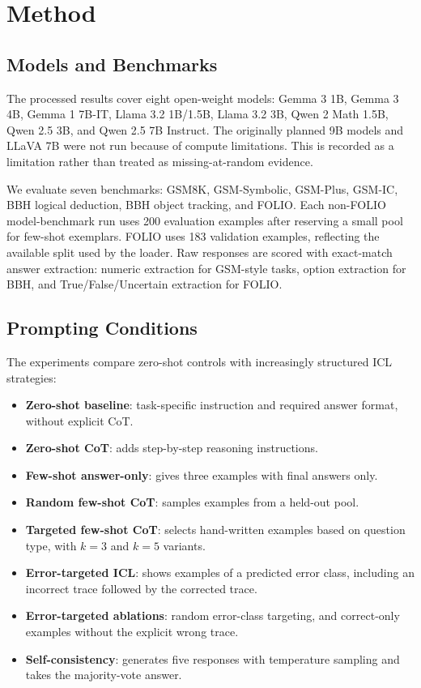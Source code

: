 \documentclass[10pt,twocolumn]{article}
\begin{document}
\section{Method}

\subsection{Models and Benchmarks}
The processed results cover eight open-weight models: Gemma 3 1B, Gemma 3 4B, Gemma 1 7B-IT, Llama 3.2 1B/1.5B, Llama 3.2 3B, Qwen 2 Math 1.5B, Qwen 2.5 3B, and Qwen 2.5 7B Instruct. The originally planned 9B models and LLaVA 7B were not run because of compute limitations. This is recorded as a limitation rather than treated as missing-at-random evidence.

We evaluate seven benchmarks: GSM8K, GSM-Symbolic, GSM-Plus, GSM-IC, BBH logical deduction, BBH object tracking, and FOLIO. Each non-FOLIO model-benchmark run uses 200 evaluation examples after reserving a small pool for few-shot exemplars. FOLIO uses 183 validation examples, reflecting the available split used by the loader. Raw responses are scored with exact-match answer extraction: numeric extraction for GSM-style tasks, option extraction for BBH, and True/False/Uncertain extraction for FOLIO.

\subsection{Prompting Conditions}
The experiments compare zero-shot controls with increasingly structured ICL strategies:
\begin{itemize}
    \item \textbf{Zero-shot baseline}: task-specific instruction and required answer format, without explicit CoT.
    \item \textbf{Zero-shot CoT}: adds step-by-step reasoning instructions.
    \item \textbf{Few-shot answer-only}: gives three examples with final answers only.
    \item \textbf{Random few-shot CoT}: samples examples from a held-out pool.
    \item \textbf{Targeted few-shot CoT}: selects hand-written examples based on question type, with $k=3$ and $k=5$ variants.
    \item \textbf{Error-targeted ICL}: shows examples of a predicted error class, including an incorrect trace followed by the corrected trace.
    \item \textbf{Error-targeted ablations}: random error-class targeting, and correct-only examples without the explicit wrong trace.
    \item \textbf{Self-consistency}: generates five responses with temperature sampling and takes the majority-vote answer.
\end{itemize}
\end{document}
